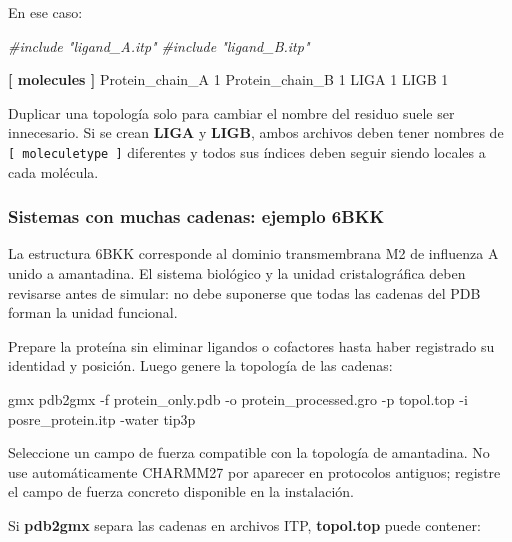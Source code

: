 \documentclass[
  spanish,
  11pt,
  a4paper]{article}
\newenvironment{Shaded}{\begin{snugshade}}{\end{snugshade}}
\newcommand{\AttributeTok}[1]{\textcolor[rgb]{0.13,0.29,0.53}{#1}}
\newcommand{\CommentTok}[1]{\textcolor[rgb]{0.56,0.35,0.01}{\textit{#1}}}
\newcommand{\DataTypeTok}[1]{\textcolor[rgb]{0.13,0.29,0.53}{#1}}
\newcommand{\ExtensionTok}[1]{#1}
\newcommand{\KeywordTok}[1]{\textcolor[rgb]{0.13,0.29,0.53}{\textbf{#1}}}
\newcommand{\NormalTok}[1]{#1}
\begin{document}
En ese caso:

\begin{Shaded}
\begin{Highlighting}[]
\CommentTok{\#include "ligand\_A.itp"}
\CommentTok{\#include "ligand\_B.itp"}

\KeywordTok{[ molecules ]}
\DataTypeTok{Protein\_chain\_A    1}
\DataTypeTok{Protein\_chain\_B    1}
\DataTypeTok{LIGA               1}
\DataTypeTok{LIGB               1}
\end{Highlighting}
\end{Shaded}

Duplicar una topología solo para cambiar el nombre del residuo suele ser
innecesario. Si se crean \textbf{LIGA} y \textbf{LIGB}, ambos archivos
deben tener nombres de \texttt{{[}\ moleculetype\ {]}} diferentes y
todos sus índices deben seguir siendo locales a cada molécula.

\subsubsection{Sistemas con muchas cadenas: ejemplo
6BKK}\label{sistemas-con-muchas-cadenas-ejemplo-6bkk}

La estructura 6BKK corresponde al dominio transmembrana M2 de influenza
A unido a amantadina. El sistema biológico y la unidad cristalográfica
deben revisarse antes de simular: no debe suponerse que todas las
cadenas del PDB forman la unidad funcional.

Prepare la proteína sin eliminar ligandos o cofactores hasta haber
registrado su identidad y posición. Luego genere la topología de las
cadenas:

\begin{Shaded}
\begin{Highlighting}[]
\ExtensionTok{gmx}\NormalTok{ pdb2gmx     }\AttributeTok{{-}f}\NormalTok{ protein\_only.pdb     }\AttributeTok{{-}o}\NormalTok{ protein\_processed.gro     }\AttributeTok{{-}p}\NormalTok{ topol.top     }\AttributeTok{{-}i}\NormalTok{ posre\_protein.itp     }\AttributeTok{{-}water}\NormalTok{ tip3p}
\end{Highlighting}
\end{Shaded}

Seleccione un campo de fuerza compatible con la topología de amantadina.
No use automáticamente CHARMM27 por aparecer en protocolos antiguos;
registre el campo de fuerza concreto disponible en la instalación.

Si \textbf{pdb2gmx} separa las cadenas en archivos ITP,
\textbf{topol.top} puede contener:
\end{document}
